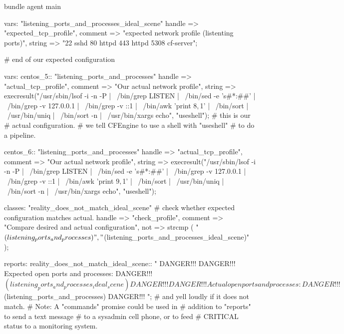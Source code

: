\begin{codelisting}
\begin{code}
bundle agent main
{
  vars:
      "listening_ports_and_processes_ideal_scene"
        handle => "expected_tcp_profile",
        comment => "expected network profile (listenting ports)",
        string => "22 sshd 80 httpd 443 httpd 5308 cf-server";

      # end of our expected configuration

  vars:
    centos_5::
      "listening_ports_and_processes"
        handle => "actual_tcp_profile",
        comment => "Our actual network profile",
        string =>
      execresult("/usr/sbin/lsof -i -n -P | \
/bin/grep LISTEN | \
/bin/sed -e 's#*:##' | \
/bin/grep -v 127.0.0.1 | \
/bin/grep -v ::1 | \
/bin/awk '{print $8,$1}' | \
/bin/sort | \
/usr/bin/uniq | \
/bin/sort -n | \
/usr/bin/xargs echo", "useshell");  # this is our
      # actual configuration.
      # we tell CFEngine to use a shell with "useshell"
      # to do a pipeline.

    centos_6::
      "listening_ports_and_processes"
        handle => "actual_tcp_profile",
        comment => "Our actual network profile",
        string =>
      execresult("/usr/sbin/lsof -i -n -P | \
/bin/grep LISTEN | \
/bin/sed -e 's#*:##' | \
/bin/grep -v 127.0.0.1 | \
/bin/grep -v ::1 | \
/bin/awk '{print $9,$1}' | \
/bin/sort | \
/usr/bin/uniq | \
/bin/sort -n | \
/usr/bin/xargs echo", "useshell");

  classes:
      "reality_does_not_match_ideal_scene"
      # check whether expected configuration matches actual.
        handle => "check_profile",
        comment => "Compare desired and actual configuration",
        not => strcmp (
                        "$(listening_ports_and_processes)",
                        "$(listening_ports_and_processes_ideal_scene)"
        );

  reports:
    reality_does_not_match_ideal_scene::
      "
DANGER!!!
DANGER!!!  Expected open ports and processes:
DANGER!!!  $(listening_ports_and_processes_ideal_scene)
DANGER!!!
DANGER!!!  Actual open ports and processes:
DANGER!!!  $(listening_ports_and_processes)
DANGER!!!
";  # and yell loudly if it does not match.
      # Note:  A "commands" promise could be used in
      # addition to "reports" to send a text message
      # to a sysadmin cell phone, or to feed
      # CRITICAL status to a monitoring system.
}
\end{code}
\end{codelisting}
